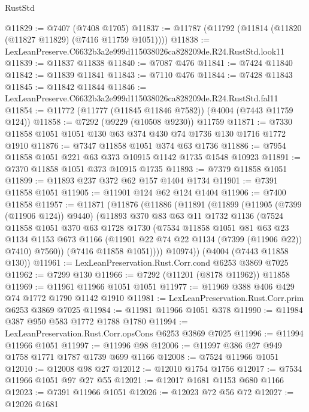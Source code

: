 \begin{lexlean}{RustStd}
\begin{coremodule}
@11829 := @7407 (@7408 @1705)
@11837 := @11787 (@11792 (@11814 (@11820 (@11827 @11829) (@7416 @11759 @1051))))
@11838 := LexLeanPreserve.C6632b3a2e999d115038026ca828209de.R24.RustStd.look11
@11839 := @11837 @11838
@11840 := @7087 @476
@11841 := @7424 @11840
@11842 := @11839 @11841
@11843 := @7110 @476
@11844 := @7428 @11843
@11845 := @11842 @11844
@11846 := LexLeanPreserve.C6632b3a2e999d115038026ca828209de.R24.RustStd.fal11
@11854 := @11772 (@11777 (@11845 @11846 @7582)) (@4004 (@7443 @11759 @124))
@11858 := @7292 (@9229 (@10508 @9230)) @11759
@11871 := @7330 @11858 @1051 @1051 @130 @63 @374 @430 @74 @1736 @130 @1716 @1772 @1910
@11876 := @7347 @11858 @1051 @374 @63 @1736
@11886 := @7954 @11858 @1051 @221 @63 @373 @10915 @1142 @1735 @1548 @10923
@11891 := @7370 @11858 @1051 @373 @10915 @1735
@11893 := @7379 @11858 @1051
@11899 := @11893 @237 @372 @62 @157 @1404 @1734
@11901 := @7391 @11858 @1051
@11905 := @11901 @124 @62 @124 @1404
@11906 := @7400 @11858
@11957 := @11871
    (@11876
      (@11886
        (@11891
          (@11899
            (@11905 (@7399 (@11906 @124)) @9440)
            (@11893
              @370
              @83
              @63
              @11
              @1732
              @1136
              (@7524
                @11858
                @1051
                @370
                @63
                @1728
                @1730
                (@7534
                  @11858
                  @1051
                  @81
                  @63
                  @23
                  @1134
                  @1153
                  @673
                  @1166
                  (@11901 @22 @74 @22 @1134 (@7399 (@11906 @22)) @7410)
                  @7560))
              (@7416 @11858 @1051))))
        @10974))
    (@4004 (@7443 @11858 @130))
@11961 := LexLeanPreservation.Rust.Corr.cond @6253 @3869 @7025
@11962 := @7299 @130
@11966 := @7292 (@11201 (@8178 @11962)) @11858
@11969 := @11961 @11966 @1051 @1051
@11977 := @11969 @388 @406 @429 @74 @1772 @1790 @1142 @1910
@11981 := LexLeanPreservation.Rust.Corr.prim @6253 @3869 @7025
@11984 := @11981 @11966 @1051 @378
@11990 := @11984 @387 @950 @583 @1772 @1788 @1780
@11994 := LexLeanPreservation.Rust.Corr.opsCons @6253 @3869 @7025
@11996 := @11994 @11966 @1051
@11997 := @11996 @98
@12006 := @11997 @386 @27 @949 @1758 @1771 @1787 @1739 @699 @1166
@12008 := @7524 @11966 @1051
@12010 := @12008 @98 @27
@12012 := @12010 @1754 @1756
@12017 := @7534 @11966 @1051 @97 @27 @55
@12021 := @12017 @1681 @1153 @680 @1166
@12023 := @7391 @11966 @1051
@12026 := @12023 @72 @56 @72
@12027 := @12026 @1681

\end{coremodule}
\end{lexlean}
